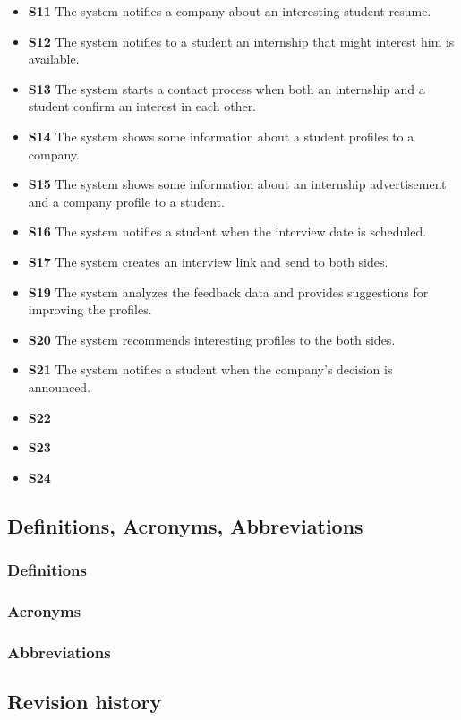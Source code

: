 \documentclass{article}
\begin{document}
    \begin{itemize}
        \item \textbf{S11} The system notifies a company about an interesting student resume.
        \item \textbf{S12} The system notifies to a student an internship that might interest him is available.
        \item \textbf{S13} The system starts a contact process when both an internship and a student confirm an interest in each other.
        \item \textbf{S14} The system shows some information about a student profiles to a company.
        \item \textbf{S15} The system shows some information about an internship advertisement and a company profile to a student.
        \item \textbf{S16} The system notifies a student when the interview date is scheduled.
        \item \textbf{S17} The system creates an interview link and send to both sides.
        \item \textbf{S19} The system analyzes the feedback data and provides suggestions for improving the profiles. 
        \item \textbf{S20} The system recommends interesting profiles to the both sides.
        \item \textbf{S21} The system notifies a student when the company's decision is announced.
        \item \textbf{S22} 
        \item \textbf{S23} 
        \item \textbf{S24} 
    \end{itemize}
\subsection{Definitions, Acronyms, Abbreviations}
\subsubsection{Definitions}
\subsubsection{Acronyms}
\subsubsection{Abbreviations}
\subsection{Revision history}
\end{document}
